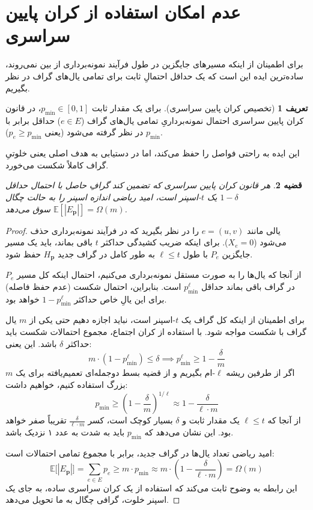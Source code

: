 \documentclass[11pt,a4paper]{report}
\theoremstyle{plain}
\newtheorem{thm}{\normalsize قضیه}[chapter]
\theoremstyle{definition}
\newtheorem{defn}[thm]{\normalsize تعریف}
\theoremstyle{remark}
\begin{document}
\section{عدم امکان استفاده از کران پایین سراسری}
برای اطمینان از اینکه مسیرهای جایگزین در طول فرآیند نمونه‌برداری از بین نمی‌روند، ساده‌ترین ایده این است که یک حداقل احتمالِ ثابت برای تمامی یال‌های گراف در نظر بگیریم.

\begin{defn}[تخصیص کران پایین سراسری]
برای یک مقدار ثابت $p_{\min} \in [0,1]$، در قانون کران پایین سراسری احتمال نمونه‌برداریِ تمامی یال‌های گراف ($e \in E$) حداقل برابر با $p_{\min}$ در نظر گرفته می‌شود (یعنی $p_e \ge p_{\min}$).
\end{defn}

این ایده به راحتی فواصل را حفظ می‌کند، اما در دستیابی به هدف اصلی یعنی خلوتیِ گراف کاملاً شکست می‌خورد.

\begin{thm}\label{thm:global_lower_bound}
هر قانون کران پایین سراسری که تضمین کند گرافِ حاصل با احتمال حداقل $1 - \delta$ یک $t$-اسپنر است، امید ریاضی اندازه اسپنر را به حالت چگال $\mathbb{E}[|E_{\mathbf{p}}|] = \Omega(m)$ سوق می‌دهد.
\end{thm}

\begin{proof}
یالی مانند $e = (u, v)$ را در نظر بگیرید که در فرآیند نمونه‌برداری حذف می‌شود ($X_e = 0$). برای اینکه ضریب کشیدگی حداکثر $t$ باقی بماند، باید یک مسیر جایگزین $P_e$ با طول $\ell \le t$ به طور کامل در گراف جدید $H_{\mathbf{p}}$ حفظ شود.

از آنجا که یال‌ها را به صورت مستقل نمونه‌برداری می‌کنیم، احتمال اینکه کل مسیر $P_e$ در گراف باقی بماند حداقل $p_{\min}^\ell$ است. بنابراین، احتمال شکست (عدم حفظ فاصله) برای این یالِ خاص حداکثر $1 - p_{\min}^\ell$ خواهد بود.

برای اطمینان از اینکه کل گراف یک $t$-اسپنر است، نباید اجازه دهیم حتی یکی از $m$ یال گراف با شکست مواجه شود. با استفاده از کران اجتماع، مجموع احتمالات شکست باید حداکثر $\delta$ باشد. این یعنی:
\[
m \cdot \left(1 - p_{\min}^\ell\right) \le \delta \implies p_{\min}^\ell \ge 1 - \frac{\delta}{m}
\]
اگر از طرفین ریشه $\ell$-ام بگیریم و از قضیه بسط دوجمله‌ای تعمیم‌یافته برای یک $m$ بزرگ استفاده کنیم، خواهیم داشت:
\[
p_{\min} \ge \left( 1 - \frac{\delta}{m} \right)^{1/\ell} \approx 1 - \frac{\delta}{\ell \cdot m}
\]
از آنجا که $\ell \le t$ یک مقدار ثابت و $\delta$ بسیار کوچک است، کسر $\frac{\delta}{\ell \cdot m}$ تقریباً صفر خواهد بود. این نشان می‌دهد که $p_{\min}$ باید به شدت به عدد ۱ نزدیک باشد.

امید ریاضی تعداد یال‌ها در گراف جدید، برابر با مجموع تمامی احتمالات است:
\[
\mathbb{E}\big[|E_{\mathbf{p}}|\big] = \sum_{e \in E} p_e \ge m \cdot p_{\min} \approx m \cdot \left(1 - \frac{\delta}{\ell \cdot m}\right) = \Omega(m)
\]
این رابطه به وضوح ثابت می‌کند که استفاده از یک کران سراسری ساده، به جای یک اسپنر خلوت، گرافی چگال به ما تحویل می‌دهد.
\end{proof}
\end{document}
